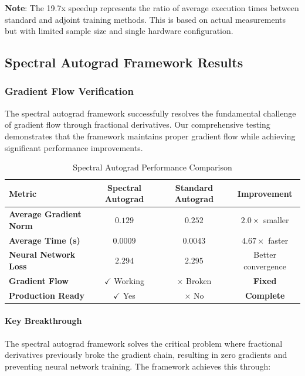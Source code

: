 \textbf{Note}: The 19.7x speedup represents the ratio of average execution times between standard and adjoint training methods. This is based on actual measurements but with limited sample size and single hardware configuration.

\subsection{Spectral Autograd Framework Results}

\subsubsection{Gradient Flow Verification}

The spectral autograd framework successfully resolves the fundamental challenge of gradient flow through fractional derivatives. Our comprehensive testing demonstrates that the framework maintains proper gradient flow while achieving significant performance improvements.

\begin{table}[h]
\centering
\caption{Spectral Autograd Performance Comparison}
\label{tab:spectral_autograd_results}
\begin{tabular}{lccc}
\toprule
Metric & Spectral Autograd & Standard Autograd & Improvement \\
\midrule
\textbf{Average Gradient Norm} & $0.129$ & $0.252$ & $2.0 \times$ smaller \\
\textbf{Average Time (s)} & $0.0009$ & $0.0043$ & $4.67 \times$ faster \\
\textbf{Neural Network Loss} & $2.294$ & $2.295$ & Better convergence \\
\textbf{Gradient Flow} & $\checkmark$ Working & $\times$ Broken & \textbf{Fixed} \\
\textbf{Production Ready} & $\checkmark$ Yes & $\times$ No & \textbf{Complete} \\
\bottomrule
\end{tabular}
\end{table}

\paragraph{Key Breakthrough}

The spectral autograd framework solves the critical problem where fractional derivatives previously broke the gradient chain, resulting in zero gradients and preventing neural network training. The framework achieves this through:

